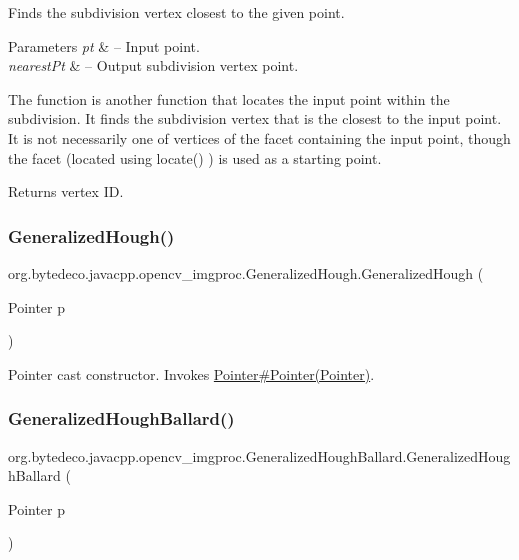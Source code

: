 Finds the subdivision vertex closest to the given point. 


\begin{DoxyParams}{Parameters}
{\em pt} & – Input point. \\
\hline
{\em nearest\+Pt} & – Output subdivision vertex point. \\
\hline
\end{DoxyParams}
The function is another function that locates the input point within the subdivision. It finds the subdivision vertex that is the closest to the input point. It is not necessarily one of vertices of the facet containing the input point, though the facet (located using locate() ) is used as a starting point. 

\begin{DoxyReturn}{Returns}
vertex ID. 
\end{DoxyReturn}
\mbox{\label{group__imgproc_ga132d7d11159b6bc9833bb4597ee499d2}} 
\subsubsection{\texorpdfstring{Generalized\+Hough()}{GeneralizedHough()}}
{\footnotesize\ttfamily org.\+bytedeco.\+javacpp.\+opencv\+\_\+imgproc.\+Generalized\+Hough.\+Generalized\+Hough (\begin{DoxyParamCaption}\item[{Pointer}]{p }\end{DoxyParamCaption})\hspace{0.3cm}{\ttfamily [inline]}}

Pointer cast constructor. Invokes \hyperlink{}{Pointer\#\+Pointer(\+Pointer)}. \mbox{\label{group__imgproc_ga89c305064b6777998f61c86e5929aee5}} 
\subsubsection{\texorpdfstring{Generalized\+Hough\+Ballard()}{GeneralizedHoughBallard()}}
{\footnotesize\ttfamily org.\+bytedeco.\+javacpp.\+opencv\+\_\+imgproc.\+Generalized\+Hough\+Ballard.\+Generalized\+Hough\+Ballard (\begin{DoxyParamCaption}\item[{Pointer}]{p }\end{DoxyParamCaption})\hspace{0.3cm}{\ttfamily [inline]}}

